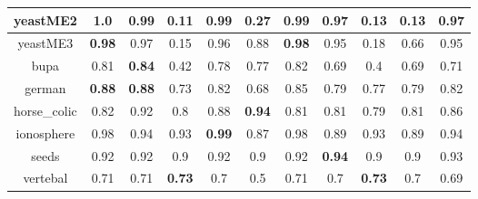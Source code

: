 \documentclass{article}%
\begin{document}
\begin{tabular}{c|cccccccccc}
\hline%
yeastME2&\textbf{1.0}&0.99&0.11&0.99&0.27&0.99&0.97&0.13&0.13&0.97\\%
\hline%
yeastME3&\textbf{0.98}&0.97&0.15&0.96&0.88&\textbf{0.98}&0.95&0.18&0.66&0.95\\%
\hline%
bupa&0.81&\textbf{0.84}&0.42&0.78&0.77&0.82&0.69&0.4&0.69&0.71\\%
\hline%
german&\textbf{0.88}&\textbf{0.88}&0.73&0.82&0.68&0.85&0.79&0.77&0.79&0.82\\%
\hline%
horse\_colic&0.82&0.92&0.8&0.88&\textbf{0.94}&0.81&0.81&0.79&0.81&0.86\\%
\hline%
ionosphere&0.98&0.94&0.93&\textbf{0.99}&0.87&0.98&0.89&0.93&0.89&0.94\\%
\hline%
seeds&0.92&0.92&0.9&0.92&0.9&0.92&\textbf{0.94}&0.9&0.9&0.93\\%
\hline%
vertebal&0.71&0.71&\textbf{0.73}&0.7&0.5&0.71&0.7&\textbf{0.73}&0.7&0.69\\%
\hline%
\end{tabular}

%
\end{document}
